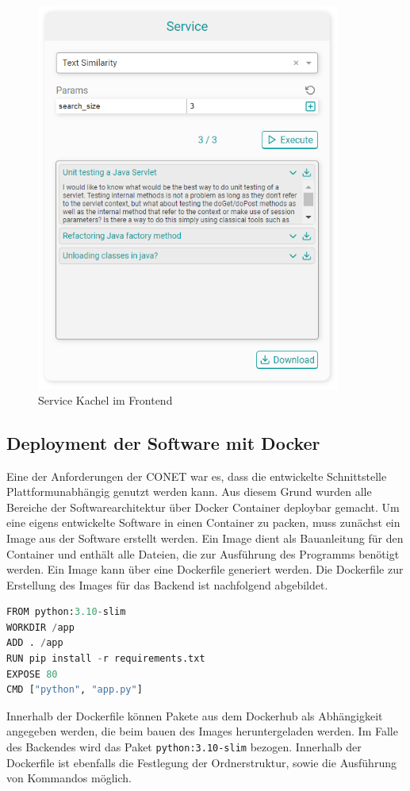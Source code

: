 \begin{figure}[H]
  \centering
    \includegraphics[width = 10cm]{bilder/websiteService}
    \caption{Service Kachel im Frontend}
\end{figure}

\subsection{Deployment der Software mit Docker}
Eine der Anforderungen der CONET war es, dass die entwickelte Schnittstelle Plattformunabhängig genutzt werden kann. Aus diesem Grund wurden alle Bereiche der Softwarearchitektur über Docker Container deploybar gemacht. Um eine eigens entwickelte Software in einen Container zu packen, muss zunächst ein Image aus der Software erstellt werden. Ein Image dient als Bauanleitung für den Container und enthält alle Dateien, die zur Ausführung des Programms benötigt werden. Ein Image kann über eine Dockerfile generiert werden. Die Dockerfile zur Erstellung des Images für das Backend ist nachfolgend abgebildet.

\begin{lstlisting}[language=Python]
FROM python:3.10-slim
WORKDIR /app
ADD . /app
RUN pip install -r requirements.txt
EXPOSE 80
CMD ["python", "app.py"]
\end{lstlisting}

Innerhalb der Dockerfile können Pakete aus dem Dockerhub als Abhängigkeit angegeben werden, die beim bauen des Images heruntergeladen werden. Im Falle des Backendes wird das Paket \texttt{python:3.10-slim} bezogen. Innerhalb der Dockerfile ist ebenfalls die Festlegung der Ordnerstruktur, sowie die Ausführung von Kommandos möglich.

